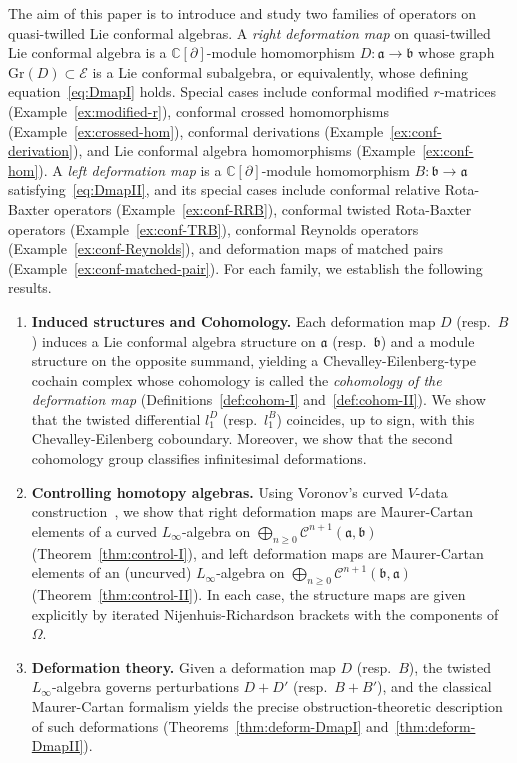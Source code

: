 \documentclass[a4paper,11pt]{article}
\def\Rg{\mathbb{C}[\partial]}
\def\Ep{\mathcal{E}}
\def\Vs{\mathfrak{a}}
\def\Ws{\mathfrak{b}}
\def\str{\Omega}
\def\Cch{\mathscr{C}}
\numberwithin{equation}{section}
\begin{document}
\medskip
The aim of this  paper is to introduce and  study two families of
operators on quasi-twilled Lie conformal  algebras.
A \emph{right deformation map} on quasi-twilled Lie conformal  algebra  is a $\Rg$-module homomorphism
$D:\Vs\to\Ws$ whose graph $\mathrm{Gr}(D)\subset\Ep$ is a Lie conformal 
subalgebra, or equivalently, whose defining
equation~\eqref{eq:DmapI} holds. Special cases include conformal
modified $r$-matrices (Example~\ref{ex:modified-r}), conformal crossed
homomorphisms (Example~\ref{ex:crossed-hom}), conformal derivations
(Example~\ref{ex:conf-derivation}), and Lie conformal  algebra
homomorphisms (Example~\ref{ex:conf-hom}). A \emph{left deformation
map} is a $\Rg$-module homomorphism $B:\Ws\to\Vs$
satisfying~\eqref{eq:DmapII}, and its special cases include conformal
relative Rota-Baxter operators (Example~\ref{ex:conf-RRB}), conformal
twisted Rota-Baxter operators (Example~\ref{ex:conf-TRB}), conformal
Reynolds operators (Example~\ref{ex:conf-Reynolds}), and deformation
maps of matched pairs (Example~\ref{ex:conf-matched-pair}).
For each family, we establish the following results.
\begin{enumerate}
  \item \textbf{Induced structures and Cohomology.} 
    Each deformation map $D$ (resp.\ $B$) induces a  Lie conformal
    algebra structure on $\Vs$ (resp.\ $\Ws$) and a module structure
    on the opposite summand, yielding a Chevalley-Eilenberg-type
    cochain complex whose cohomology is called the
    \emph{cohomology of the deformation map}
    (Definitions~\ref{def:cohom-I} and~\ref{def:cohom-II}).
    We show that the twisted differential $l_1^D$ (resp.\ $l_1^B$)
    coincides, up to sign, with this Chevalley-Eilenberg coboundary. 
    Moreover, we show that the second cohomology group classifies infinitesimal
    deformations.  
  \item \textbf{Controlling homotopy algebras.}
    Using Voronov's curved $V$-data construction~\cite{Vo}, we show
    that right deformation maps are Maurer-Cartan elements of a curved
    $L_\infty$-algebra on
    $\bigoplus_{n\geq0}\Cch^{n+1}(\Vs,\Ws)$
    (Theorem~\ref{thm:control-I}), and left deformation maps are
    Maurer-Cartan elements of an (uncurved) $L_\infty$-algebra on
    $\bigoplus_{n\geq0}\Cch^{n+1}(\Ws,\Vs)$
    (Theorem~\ref{thm:control-II}). In each case, the structure maps
    are given explicitly by iterated Nijenhuis-Richardson brackets
    with the components of $\str$.
  \item \textbf{Deformation theory.}
    Given a deformation map $D$ (resp.\ $B$), the twisted
    $L_\infty$-algebra governs perturbations $D+D'$ (resp.\ $B+B'$),
    and the classical Maurer-Cartan formalism yields the precise
    obstruction-theoretic description of such deformations
    (Theorems~\ref{thm:deform-DmapI} and~\ref{thm:deform-DmapII}).
\end{enumerate}
\end{document}
